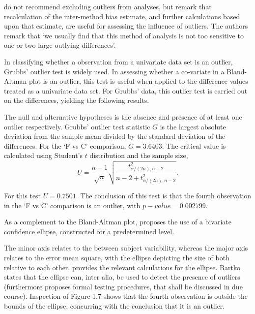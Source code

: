 \documentclass[12pt, a4paper]{report}
\begin{document}
	
	\citet*{BA99} do not recommend excluding outliers from analyses,
	but remark that recalculation of the inter-method bias estimate,
	and further calculations based upon that estimate, are useful for
	assessing the influence of outliers. The authors remark that `we
	usually find that this method of analysis is not too sensitive to
	one or two large outlying differences'.
	
	
	
	In classifying whether a observation from a univariate data set is
	an outlier, Grubbs' outlier test is widely used. In assessing
	whether a co-variate in a Bland-Altman plot is an outlier, this
	test is useful when applied to the difference values treated as a
	univariate data set. For Grubbs' data, this outlier test is
	carried out on the differences, yielding the following results.
	
	The null and alternative hypotheses is the absence and presence of
	at least one outlier respectively. Grubbs' outlier test statistic
	$G$ is the largest absolute deviation from the sample mean divided
	by the standard deviation of the differences. For the `F vs C'
	comparison, $G = 3.6403$. The critical value is calculated using
	Student's $t$ distribution and the sample size,
	\begin{equation}
	U = \frac{n-1}{\sqrt{n}} \sqrt{\frac{t_{\alpha/(2n),n-2}^2}{n - 2
			+ t_{\alpha/(2n),n-2}^2}}.
	\end{equation}
	
	For this test $U = 0.7501$. The conclusion of this test is that
	the fourth observation in the `F vs C' comparison is an outlier,
	with $p-value = 0.002799$.
	
	As a complement to the Bland-Altman plot, \citet{Bartko} proposes
	the use of a bivariate confidence ellipse, constructed for a
	predetermined level.
	
	The minor axis relates to the between subject variability, whereas the major axis relates to the error mean square, with the ellipse
	depicting the size of both relative to each	other.\citet{AltmanEllipse} provides the relevant calculations for
	the ellipse. Bartko states that the ellipse can, inter alia, be
	used to detect the presence of outliers (furthermore \citet{Bartko} proposes formal testing procedures, that shall be
	discussed in due course). Inspection of Figure 1.7 shows that the
	fourth observation is outside the bounds of the ellipse, concurring with the conclusion that it is an outlier.
	
\end{document}
